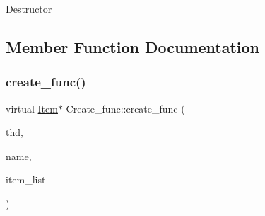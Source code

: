 Destructor 

\subsection{Member Function Documentation}
\mbox{\label{classCreate__func_a04aa802c4546f72d1c10db1983cece5b}} 
\subsubsection{\texorpdfstring{create\+\_\+func()}{create\_func()}}
{\footnotesize\ttfamily virtual \mbox{\hyperlink{classItem}{Item}}$\ast$ Create\+\_\+func\+::create\+\_\+func (\begin{DoxyParamCaption}\item[{T\+HD $\ast$}]{thd,  }\item[{L\+E\+X\+\_\+\+S\+T\+R\+I\+NG}]{name,  }\item[{\mbox{\hyperlink{classPT__item__list}{P\+T\+\_\+item\+\_\+list}} $\ast$}]{item\+\_\+list }\end{DoxyParamCaption})\hspace{0.3cm}{\ttfamily [pure virtual]}}

